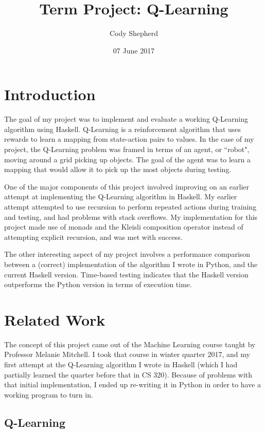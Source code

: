\documentclass[12pt,a4paper]{article}
\title{Term Project: Q-Learning}
\date{07 June 2017}
\author{Cody Shepherd}
\begin{document}
\maketitle

\normalsize

	\section{Introduction}
	
	\par The goal of my project was to implement and evaluate a working Q-Learning algorithm using Haskell. Q-Learning is a reinforcement algorithm that uses rewards to learn a mapping from state-action pairs to values. In the case of my project, the Q-Learning problem was framed in terms of an agent, or ``robot", moving around a grid picking up objects. The goal of the agent was to learn a mapping that would allow it to pick up the most objects during testing.
	\par One of the major components of this project involved improving on an earlier attempt at implementing the Q-Learning algorithm in Haskell. My earlier attempt attempted to use recursion to perform repeated actions during training and testing, and had problems with stack overflows. My implementation for this project made use of monads and the Kleisli composition operator instead of attempting explicit recursion, and was met with success.
	\par The other interesting aspect of my project involves a performance comparison between a (correct) implementation of the algorithm I wrote in Python, and the current Haskell version. Time-based testing indicates that the Haskell version outperforms the Python version in terms of execution time.
	
	
	\section{Related Work}
	
	\par The concept of this project came out of the Machine Learning course taught by Professor Melanie Mitchell. I took that course in winter quarter 2017, and my first attempt at the Q-Learning algorithm I wrote in Haskell (which I had partially learned the quarter before that in CS 320). Because of problems with that initial implementation, I ended up re-writing it in Python in order to have a working program to turn in. 
	
		\subsection{Q-Learning}\label{beefcake}
		
\end{document}
